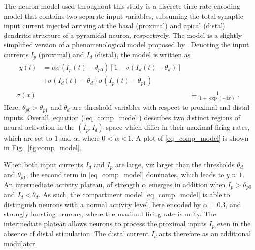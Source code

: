 \documentclass[utf8]{frontiersSCNS} %
\begin{document}
The neuron model used throughout this study 
is a discrete-time rate encoding model that 
contains two separate input variables, 
subsuming the total synaptic input current injected arriving 
at the basal (proximal) and apical (distal) 
dendritic structure of a pyramidal neuron, respectively. 
The model is a slightly simplified version of a phenomenological 
model proposed by \citet{Shai_2015}. Denoting the input currents 
$I_p$ (proximal) and $I_d$ (distal), 
the model is written as
\begin{align}
\begin{split}
y\left(t\right) &= \alpha  \sigma\left( I_p(t) - \theta_{p0} \right)
\left[1-\sigma\left(I_d(t) - \theta_d\right)\right] \\
&+ \sigma\left(I_d(t) - \theta_d \right)
\sigma\left( I_p(t) - \theta_{p1} \right)
\end{split} 
\label{eq_comp_model}\\
\sigma(x) &\equiv \frac{1}{1+\exp(-4x)} \; .
\end{align}
Here, $\theta_{p0}>\theta_{p1}$ and $\theta_d$ 
are threshold variables with respect to proximal 
and distal inputs. Overall, equation 
(\ref{eq_comp_model}) describes two distinct
regions of neural activation in the 
$(I_p, I_d)$-space which differ in their
maximal firing rates, which are set to $1$ and 
$\alpha$, where $0 < \alpha < 1$.
A plot of \eqref{eq_comp_model} is shown 
in Fig.~\ref{fig:comp_model}.

When both input currents $I_d$ and $I_p$ 
are large, viz larger than the 
thresholds $\theta_d$ and $\theta_{p1}$,
the second term in \eqref{eq_comp_model}
dominates, which leads to $y\approx 1$. 
An intermediate activity plateau, of
strength $\alpha$ emerges in addition 
when $I_p>\theta_{p0}$ and 
$I_d<\theta_{d}$. As such, the compartment
model \eqref{eq_comp_model} is able to
distinguish neurons with a normal activity 
level, here encoded by $\alpha=0.3$, and
strongly bursting neurons, where the maximal
firing rate is unity. The intermediate plateau
allows neurons to process the proximal 
inputs $I_p$ even in the absence of distal
stimulation. The distal current $I_d$
acts therefore as an additional modulator.
\end{document}

